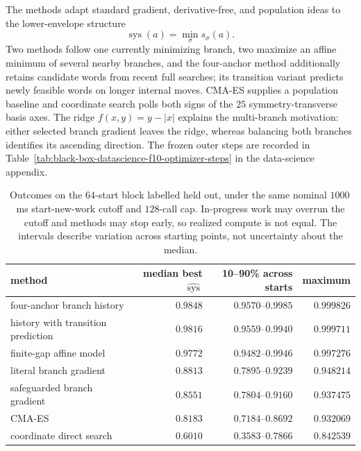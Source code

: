 The methods adapt standard gradient, derivative-free, and population ideas
\cite{NocedalWright2006} to the lower-envelope structure
\[
  \operatorname{sys}(a)=\min_\sigma s_\sigma(a).
\]
Two methods follow one currently minimizing branch, two maximize an affine
minimum of several nearby branches, and the four-anchor method additionally
retains candidate words from recent full searches; its transition variant
predicts newly feasible words on longer internal moves.  CMA-ES supplies a
population baseline and coordinate search polls both signs of the \(25\)
symmetry-transverse basis axes.  The ridge \(f(x,y)=y-|x|\) explains the
multi-branch motivation: either selected branch gradient leaves the ridge,
whereas balancing both branches identifies its ascending direction.  The
frozen outer steps are recorded in
Table~\ref{tab:black-box-datascience-f10-optimizer-steps} in the data-science
appendix.

\begin{table}[htbp]
\centering
\scriptsize
\begin{tabular}{lrrr}
\toprule
method & median best \(\widehat{\operatorname{sys}}\) & 10--90\% across starts & maximum\\
\midrule
four-anchor branch history & \(0.9848\) & \(0.9570\)--\(0.9985\) & \(0.999826\)\\
history with transition prediction & \(0.9816\) & \(0.9559\)--\(0.9940\) & \(0.999711\)\\
finite-gap affine model & \(0.9772\) & \(0.9482\)--\(0.9946\) & \(0.997276\)\\
literal branch gradient & \(0.8813\) & \(0.7895\)--\(0.9239\) & \(0.948214\)\\
safeguarded branch gradient & \(0.8551\) & \(0.7804\)--\(0.9160\) & \(0.937475\)\\
CMA-ES & \(0.8183\) & \(0.7184\)--\(0.8692\) & \(0.932069\)\\
coordinate direct search & \(0.6010\) & \(0.3583\)--\(0.7866\) & \(0.842539\)\\
\bottomrule
\end{tabular}
\caption{Outcomes on the \(64\)-start block labelled held out, under the same
nominal \(1000\)\,ms start-new-work cutoff and \(128\)-call cap.  In-progress
work may overrun the cutoff and methods may stop early, so realized compute is
not equal.  The intervals describe variation across starting points, not
uncertainty about the median.}
\label{tab:black-box-datascience-f10-optimizer-comparison}
\end{table}

